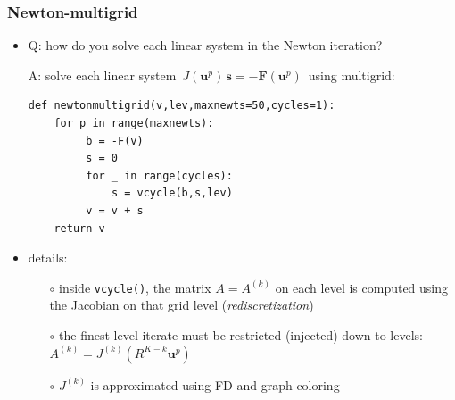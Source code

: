 \documentclass[10pt,
               svgnames,
               hyperref={colorlinks,citecolor=DeepPink4,linkcolor=FireBrick,urlcolor=Maroon},
               usepdftitle=false]{beamer}
\newcommand{\bs}{\mathbf{s}}
\newcommand{\bu}{\mathbf{u}}
\newcommand{\bF}{\mathbf{F}}
\begin{document}
\begin{frame}[fragile]
\frametitle{Newton-multigrid}

\begin{itemize}
\item Q: how do you solve each linear system in the Newton iteration?

\medskip
A: solve each linear system \,$J(\bu^{p})\, \bs = - \bF(\bu^p)$ \,\alert{using multigrid}:

\medskip
\begin{verbatim}
def newtonmultigrid(v,lev,maxnewts=50,cycles=1):
    for p in range(maxnewts):
         b = -F(v)
         s = 0
         for _ in range(cycles):
             s = vcycle(b,s,lev)
         v = v + s
    return v
\end{verbatim}

\medskip
\item<2> details:
	\begin{itemize}
	\item[$\circ$] inside \texttt{vcycle()}, the matrix $A=A^{(k)}$ on each level is computed using the Jacobian on that grid level (\emph{rediscretization})
	\item[$\circ$] the finest-level iterate must be restricted (injected) down to levels:\, $A^{(k)}=J^{(k)}(R^{K-k} \bu^p)$
	\item[$\circ$] $J^{(k)}$ is approximated using FD and graph coloring
	\end{itemize}
\end{itemize}
\end{frame}
\end{document}
